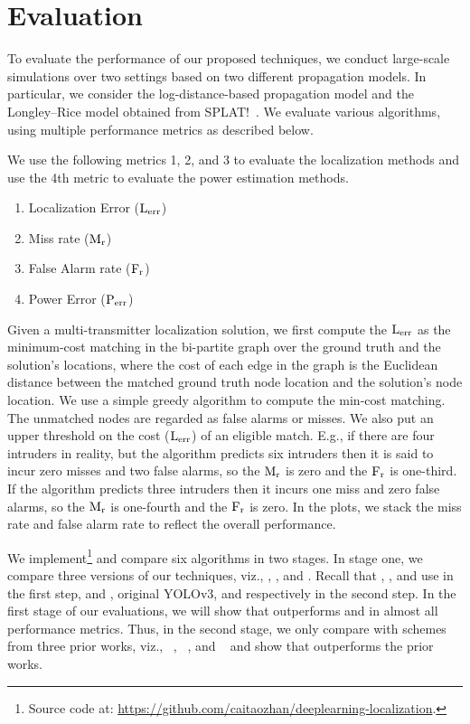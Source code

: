 \section{Evaluation}
\label{sec:evaluation}

To evaluate the performance of our proposed techniques, we conduct large-scale simulations over
two settings based on two different propagation models. In particular, we consider the log-distance-based
propagation model and the Longley--Rice model obtained from SPLAT!~\cite{splat}. We evaluate various 
algorithms, using multiple performance metrics as described below. 

 We use the following metrics 1, 2, and 3 to evaluate the localization methods and use the 4th metric to evaluate the power estimation methods.
\begin{enumerate}
    \item Localization Error ($\mathrm{L_{err}}$)
    \item Miss rate ($\mathrm{M_{r}}$)
    \item False Alarm rate ($\mathrm{F_{r}}$)
    \item Power Error ($\mathrm{P_{err}}$)
\end{enumerate}
Given a multi-transmitter localization solution, we first compute the $\mathrm{L_{err}}$ as
the minimum-cost matching in the bi-partite graph over the
ground truth and the solution's locations, where the cost of each edge in the graph is the Euclidean distance between the matched ground truth node location and the solution's node location.
We use a simple greedy algorithm to compute the min-cost matching.
The unmatched nodes are regarded as false alarms or misses. 
We also put an upper threshold on the cost ($\mathrm{L_{err}}$) of an eligible match. 
E.g., if there are four intruders in reality, but the algorithm predicts six
intruders then it is said to incur zero misses and two false alarms, so the $\mathrm{M_{r}}$ is zero and the $\mathrm{F_{r}}$ is one-third. 
If the algorithm predicts three intruders then it incurs one miss and zero false alarms, so the $\mathrm{M_{r}}$ is one-fourth and the $\mathrm{F_{r}}$ is zero.
In the plots, we stack the miss rate and false alarm rate to reflect the overall performance.


We implement\footnote{Source code at: \url{https://github.com/caitaozhan/deeplearning-localization}.} and compare six algorithms in two stages. In stage one, we compare three versions of our
techniques, viz., \our, \ouryolo, and \ourpeak.  Recall that \our, \ouryolo, and \ourpeak 
use \imgimg in the first step, and \yolocust, original YOLOv3, and \simpeak respectively in the second step. In the first stage of our evaluations, we will show that 
\our outperforms \ouryolo and \ourpeak in almost all performance metrics. 
Thus, in the second stage, we only compare \our with
schemes from three prior works, viz., \splot~\cite{mobicom17-splot}, \deeptx~\cite{icccn20-deeptxfinder},
and \map~\cite{ipsn20-mtl} and show that \our outperforms the prior works.

